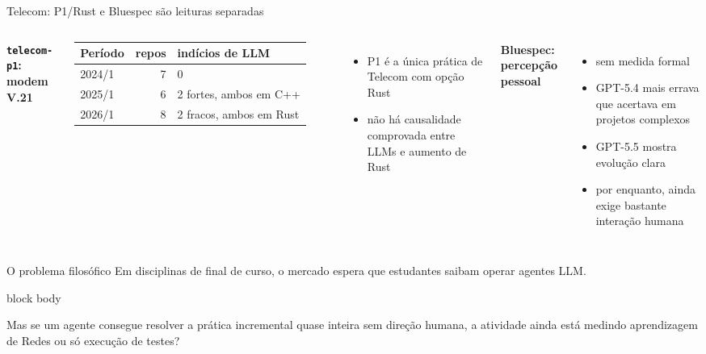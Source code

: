 \documentclass[aspectratio=169,11pt]{beamer}
\newcommand{\eyebrow}[1]{{\color{caipyraOrange}\small\bfseries #1}\par\vspace{0.25em}}
\newcommand{\callout}[1]{%
  \begin{beamercolorbox}[wd=\linewidth,sep=0.7em,rounded=true]{block body}
    #1
  \end{beamercolorbox}
}
\newenvironment{tightitemize}{%
  \begin{itemize}\setlength{\itemsep}{0.25em}\setlength{\parskip}{0pt}
}{\end{itemize}}
\begin{document}
\begin{frame}{Telecom: P1/Rust e Bluespec são leituras separadas}
  \begin{columns}[T,onlytextwidth]
    \eyebrow{\texttt{telecom-p1}: modem V.21}
    \footnotesize
    \begin{tabular}{@{}lrl@{}}
      \toprule
      Período & repos & indícios de LLM\\
      \midrule
      2024/1 & 7 & 0\\
      2025/1 & 6 & 2 fortes, ambos em C++\\
      2026/1 & 8 & 2 fracos, ambos em Rust\\
      \bottomrule
    \end{tabular}

    \vspace{0.55em}
    \begin{minipage}{0.9\linewidth}
      \begin{tightitemize}
        \item P1 é a única prática de Telecom com opção Rust
        \item não há causalidade comprovada entre LLMs e aumento de Rust
      \end{tightitemize}
    \end{minipage}

    \eyebrow{Bluespec: percepção pessoal}
    \begin{tightitemize}
      \item sem medida formal
      \item GPT-5.4 mais errava que acertava em projetos complexos
      \item GPT-5.5 mostra evolução clara
      \item por enquanto, ainda exige bastante interação humana
    \end{tightitemize}
  \end{columns}
\end{frame}

\begin{frame}{O problema filosófico}
  \Large
  Em disciplinas de final de curso, o mercado espera que estudantes saibam operar
  agentes LLM.

  \vspace{0.8em}
  \normalsize
  \callout{
    Mas se um agente consegue resolver a prática incremental quase inteira sem
    direção humana, a atividade ainda está medindo aprendizagem de Redes ou só
    execução de testes?
  }
\end{frame}
\end{document}
